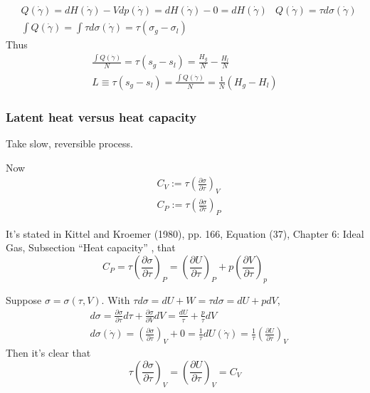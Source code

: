 \[
\begin{aligned}
  & Q(\dot{\gamma}) = dH(\dot{\gamma}) - Vdp(\dot{\gamma}) = dH(\dot{\gamma}) - 0 = dH(\dot{\gamma})
  & Q(\dot{\gamma}) = \tau d\sigma(\dot{\gamma}) \\ 
  & \int Q(\dot{\gamma}) = \int \tau d\sigma(\dot{\gamma}) = \tau(\sigma_g - \sigma_l)
\end{aligned}
\]
Thus
\[
\begin{gathered}
  \frac{ \int Q(\dot{\gamma})}{ N} = \tau (s_g - s_l ) = \frac{H_g}{N} - \frac{H_l}{N} \\ 
  L \equiv \tau(s_g - s_l) = \frac{ \int Q(\dot{\gamma})}{ N} = \frac{1}{N} (H_g -H_l)
\end{gathered}
\]

\subsubsection*{Latent heat versus heat capacity}

Take slow, reversible process.  

Now 
\[
\begin{aligned}
  & C_V := \tau \left( \frac{ \partial \sigma }{ \partial \tau} \right)_V \\ 
  & C_P := \tau \left( \frac{ \partial \sigma }{ \partial \tau } \right)_P
\end{aligned}
\]

It's stated in Kittel and Kroemer (1980), pp. 166, Equation (37), Chapter 6: Ideal Gas, Subsection ``Heat capacity'' \cite{CKittelHKroemer1980}, that 
\begin{equation}
  C_P = \tau \left( \frac{ \partial \sigma }{ \partial \tau} \right)_P = \left( \frac{ \partial U }{ \partial \tau} \right)_P + p \left( \frac{ \partial V}{ \partial \tau} \right)_p
\end{equation}

Suppose $\sigma = \sigma(\tau, V)$.  With $\tau d\sigma = dU + W = \tau d\sigma = dU + pdV$, 
\[
\begin{aligned}
  & d\sigma = \frac{ \partial \sigma }{ \partial \tau } d\tau + \frac{ \partial \sigma }{ \partial V} dV = \frac{dU}{ \tau} + \frac{p}{\tau} dV \\ 
  & d\sigma(\dot{\gamma}) = \left( \frac{ \partial \sigma}{ \partial \tau} \right)_V + 0 = \frac{1}{\tau} dU(\dot{\gamma}) = \frac{1}{\tau} \left( \frac{ \partial U}{ \partial \tau} \right)_V
\end{aligned}
\]
Then it's clear that 
\[
\tau \left( \frac{ \partial \sigma }{ \partial \tau } \right)_V = \left( \frac{ \partial U}{ \partial \tau} \right)_V = C_V
\]

